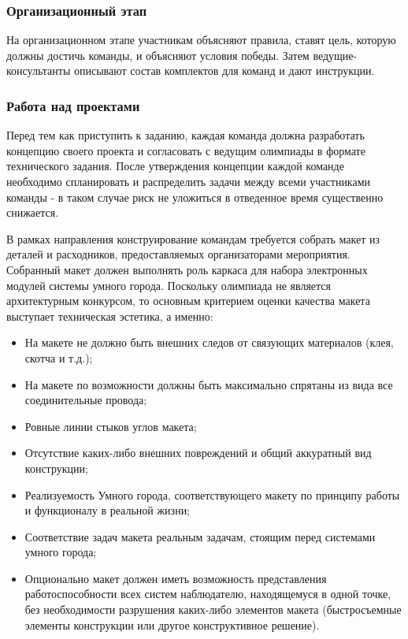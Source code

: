 \subsubsection*{Организационный этап}

На организационном этапе участникам объясняют правила, ставят цель, которую должны достичь команды, и объясняют условия победы. Затем ведущие-консультанты описывают состав комплектов для команд и дают инструкции.

\subsubsection*{Работа над проектами}

Перед тем как приступить к заданию, каждая команда должна разработать концепцию своего проекта и согласовать с ведущим олимпиады в формате технического задания. После утверждения концепции каждой команде необходимо спланировать и распределить задачи между всеми участниками команды - в таком случае риск не уложиться в отведенное время существенно снижается.

В рамках направления конструирование командам требуется собрать макет из деталей и расходников, предоставляемых организаторами мероприятия. Собранный макет должен выполнять роль каркаса для набора электронных модулей системы умного города. Поскольку олимпиада не является архитектурным конкурсом, то основным критерием оценки качества макета выступает техническая эстетика, а именно:

\begin{itemize}
    \item На макете не должно быть внешних следов от связующих материалов (клея, скотча и т.д.);
    \item На макете по возможности должны быть максимально спрятаны из вида все соединительные провода;
    \item Ровные линии стыков углов макета;
    \item Отсутствие каких-либо внешних повреждений и общий аккуратный вид конструкции;
    \item Реализуемость Умного города, соответствующего макету по принципу работы и функционалу в реальной жизни;
    \item Соответствие задач макета реальным задачам, стоящим перед системами умного города;
    \item Опционально макет должен иметь возможность представления работоспособности всех систем наблюдателю, находящемуся в одной точке, без необходимости разрушения каких-либо элементов макета (быстросъемные элементы конструкции или другое конструктивное решение).        
\end{itemize}

